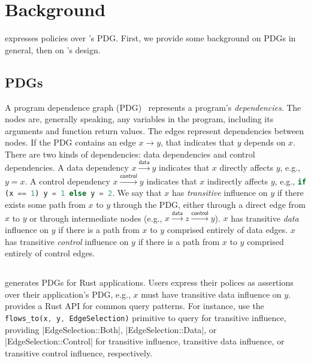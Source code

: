 \chapter{Background}

\syslang{} expresses policies over \sys{}'s PDG.
%
First, we provide some background on PDGs in general, then on \sys{}'s design.

\section{PDGs}
A program dependence graph (PDG)~\cite{ferranteProgramDependenceGraph1987} represents a program's \emph{dependencies}.
%
The nodes are, generally speaking, any variables in the program, including its arguments and function return values.
%
The edges represent dependencies between nodes.
%
If the PDG contains an edge $x \xrightarrow{} y$, that indicates that $y$ depends on $x$.
%
There are two kinds of dependencies: data dependencies and control dependencies.
%
A data dependency $x \xrightarrow{\mathsf{data}} y$ indicates that $x$ directly affects $y$, e.g., $y = x$.
%
A control dependency $x \xrightarrow{\mathsf{control}} y$ indicates that $x$ indirectly affects $y$, 
e.g., \lstinline[language=Rust]|if (x == 1) y = 1 else y = 2|.
%
We say that $x$ has \emph{transitive} influence on $y$ if there exists some path from $x$ to $y$ through the PDG,
either through a direct edge from $x$ to $y$ or through intermediate nodes 
(e.g., $x \xrightarrow{\mathsf{data}} z \xrightarrow{\mathsf{control}} y$).
%
$x$ has transitive \emph{data} influence on $y$ if there is a path from $x$ to $y$ comprised entirely of data edges.
%
$x$ has transitive \emph{control} influence on $y$ if there is a path from $x$ to $y$ comprised entirely of control edges.

\section{\sys{}}

\sys{} generates PDGs for Rust applications.
%
Users express their polices as assertions over their application's PDG, 
e.g., $x$ must have transitive data influence on $y$.
%
\sys{} provides a Rust API for common query patterns.
%
For instance, \writers{} use the \lstinline[language=Rust]|flows_to(x, y, EdgeSelection)| primitive to query for transitive influence, 
providing |EdgeSelection::Both|, |EdgeSelection::Data|, or |EdgeSelection::Control| for transitive influence,
transitive data influence, or transitive control influence, respectively.


